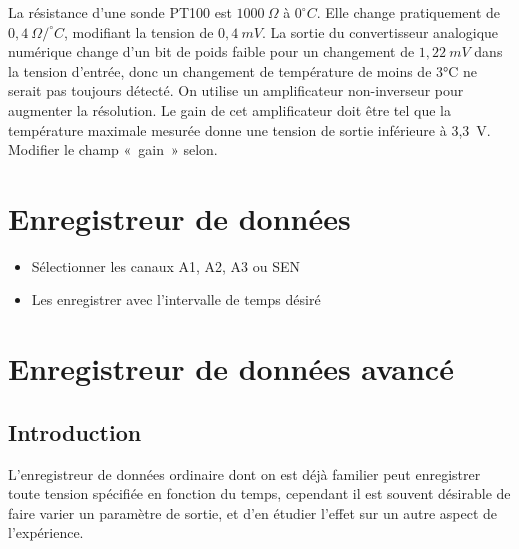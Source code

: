 \documentclass[a4paper,12pt,french]{sphinxmanual}
\begin{document}
La résistance d’une sonde PT100 est \(1000~\Omega\) à \(0^\circ C\). Elle change
pratiquement de \(0,4~\Omega /^\circ C\), modifiant la tension de
\(0, 4~mV\). La
sortie du convertisseur analogique numérique change d’un bit de poids
faible pour un changement de \(1,22~mV\) dans la tension d’entrée, donc
un changement de température de moins de 3°C ne serait pas toujours
détecté. On utilise un amplificateur non-inverseur pour augmenter la
résolution. Le gain de cet amplificateur doit être tel que la
température maximale mesurée donne une tension de sortie inférieure à
3,3 V. Modifier le champ « gain » selon.


\section{Enregistreur de données}
\label{\detokenize{6.6:enregistreur-de-donnees}}\label{\detokenize{6.6::doc}}\begin{itemize}
\item {} 
Sélectionner les canaux A1, A2, A3 ou SEN

\item {} 
Les enregistrer avec l’intervalle de temps désiré

\end{itemize}


\section{Enregistreur de données avancé}
\label{\detokenize{6.7:enregistreur-de-donnees-avance}}\label{\detokenize{6.7::doc}}

\subsection{Introduction}
\label{\detokenize{6.7:introduction}}
L’enregistreur de données ordinaire dont on est déjà familier peut
enregistrer toute tension spécifiée en fonction du temps, cependant
il est souvent désirable de faire varier un paramètre de sortie, et d’en
étudier l’effet sur un autre aspect de l’expérience.
\end{document}

